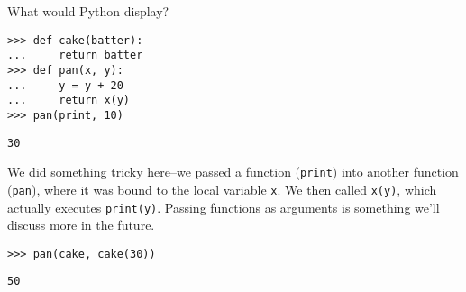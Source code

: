 \question What would Python display?

\begin{lstlisting}
>>> def cake(batter):
...     return batter
>>> def pan(x, y):
...     y = y + 20
...     return x(y)
>>> pan(print, 10)
\end{lstlisting}

\begin{solution}[1in]
\texttt{30}

We did something tricky here--we passed a function (\texttt{print}) into another
function (\texttt{pan}), where it was bound to the local variable \texttt{x}. We
then called \texttt{x(y)}, which actually executes \texttt{print(y)}.
Passing functions as arguments is something we'll discuss more in the future.
\end{solution}

\begin{lstlisting}
>>> pan(cake, cake(30))
\end{lstlisting}

\begin{solution}[1in]
\texttt{50}
\end{solution}
